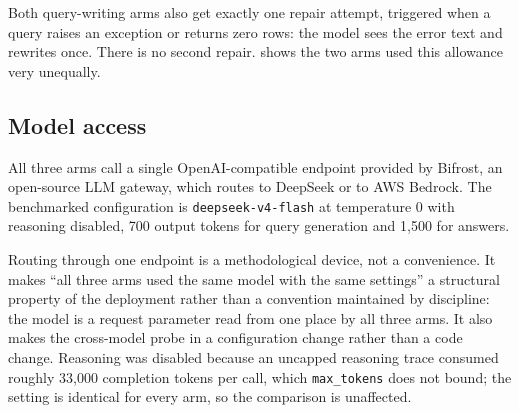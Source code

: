 Both query-writing arms also get exactly one repair attempt, triggered when a
query raises an exception or returns zero rows: the model sees the error text and
rewrites once. There is no second repair.  shows the two arms
used this allowance very unequally.

\subsection{Model access}

All three arms call a single OpenAI-compatible endpoint provided by Bifrost, an
open-source LLM gateway, which routes to DeepSeek or to AWS Bedrock. The
benchmarked configuration is \texttt{deepseek-v4-flash} at temperature 0 with
reasoning disabled, 700 output tokens for query generation and 1{,}500 for
answers.

Routing through one endpoint is a methodological device, not a convenience. It
makes ``all three arms used the same model with the same settings'' a structural
property of the deployment rather than a convention maintained by discipline: the
model is a request parameter read from one place by all three arms. It also makes
the cross-model probe in  a configuration change rather than a
code change. Reasoning was disabled because an uncapped reasoning trace consumed
roughly 33{,}000 completion tokens per call, which \texttt{max\_tokens} does not
bound; the setting is identical for every arm, so the comparison is unaffected.
